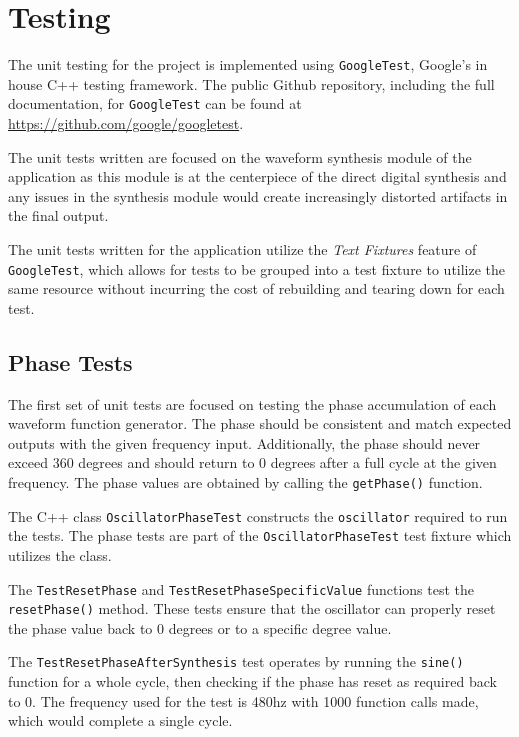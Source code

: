 \documentclass[a4paper,12pt]{report}
\begin{document}
\section{Testing}
\label{sec:testing}
The unit testing for the project is implemented using \texttt{GoogleTest}, Google's in house C++ testing framework. The public Github repository, including the full documentation, for \texttt{GoogleTest} can be found at \href{https://github.com/google/googletest}{https://github.com/google/googletest}.

The unit tests written are focused on the waveform synthesis module of the application as this module is at the centerpiece of the direct digital synthesis and any issues in the synthesis module would create increasingly distorted artifacts in the final output.

The unit tests written for the application utilize the \emph{Text Fixtures} feature of \texttt{GoogleTest}, which allows for tests to be grouped into a test fixture to utilize the same resource without incurring the cost of rebuilding and tearing down for each test. 

\subsection{Phase Tests}
\label{subsec:phasetests}
The first set of unit tests are focused on testing the phase accumulation of each waveform function generator. The phase should be consistent and match expected outputs with the given frequency input. Additionally, the phase should never exceed 360 degrees and should return to 0 degrees after a full cycle at the given frequency. The phase values are obtained by calling the \texttt{getPhase()} function.

The C++ class \texttt{OscillatorPhaseTest} constructs the \texttt{oscillator} required to run the tests. The phase tests are part of the \texttt{OscillatorPhaseTest} test fixture which utilizes the class.

The \texttt{TestResetPhase} and \texttt{TestResetPhaseSpecificValue} functions test the \texttt{resetPhase()} method. These tests ensure that the oscillator can properly reset the phase value back to 0 degrees or to a specific degree value.

The \texttt{TestResetPhaseAfterSynthesis} test operates by running the \texttt{sine()} function for a whole cycle, then checking if the phase has reset as required back to 0. The frequency used for the test is 480hz with 1000 function calls made, which would complete a single cycle.
\end{document}
